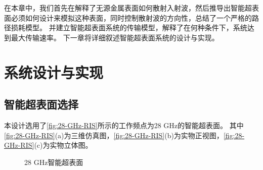 \documentclass[supercite]{HustGraduPaper}
\begin{document}
在本章中，我们首先在解释了无源金属表面如何散射入射波，然后推导出智能超表面必须如何设计来模拟这种表面，同时控制散射波的方向性，总结了一个严格的路径损耗模型。
并建立智能超表面系统的传输模型，解释了在何种条件下，系统达到最大传输速率。
下一章将详细叙述智能超表面系统的设计与实现。

\section{系统设计与实现}\label{sec:design}

\subsection{智能超表面选择}\label{subsec:28-GHz-RIS}

本设计选用了\autoref{fig:28-GHz-RIS}所示的工作频点为28 GHz的智能超表面。
其中\autoref{fig:28-GHz-RIS}(a)为三维仿真图，\autoref{fig:28-GHz-RIS}(b)为实物正视图，\autoref{fig:28-GHz-RIS}(c)为实物立体图。

\begin{figure}[htb]
	\centering
	\hfil
	\hfil
	\caption{28 GHz智能超表面}
	\label{fig:28-GHz-RIS}
\end{figure}
\end{document}
